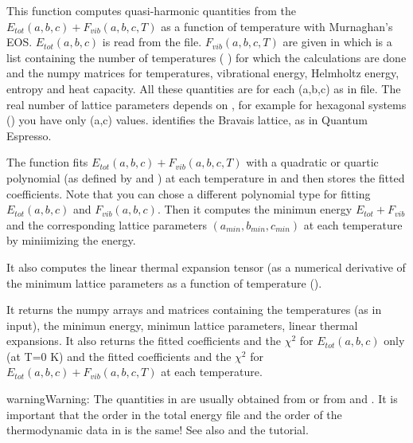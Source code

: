 \documentclass[letterpaper,10pt,english]{sphinxmanual}
\begin{document}
\label{pyqha:module-pyqha.fitFvib}

\begin{fulllineitems}
\label{pyqha:pyqha.fitFvib.fitFvib}
This function computes quasi-harmonic quantities from the 
\(E_{tot}(a,b,c)+F_{vib}(a,b,c,T)\) as a function of temperature with Murnaghan's
EOS. \(E_{tot}(a,b,c)\) is read from the  file. \(F_{vib}(a,b,c,T)\)
are given in  which is a list containing the number of temperatures
(  ) for which the calculations are done and the numpy matrices for 
temperatures, vibrational energy, Helmholtz energy, entropy and
heat capacity. All these quantities are for each (a,b,c) as in  file. The 
real number of lattice parameters depends on , for example for 
hexagonal systems () you have only (a,c) values.  identifies
the Bravais lattice, as in Quantum Espresso.

The function fits \(E_{tot}(a,b,c)+F_{vib}(a,b,c,T)\) with a quadratic
or quartic polynomial (as defined by  and  ) at each
temperature in  and then stores the fitted coefficients.    
Note that you can chose a different polynomial type for fitting \(E_{tot}(a,b,c)\)
and \(F_{vib}(a,b,c)\). Then it computes the minimun energy \(E_{tot}+F_{vib}\)
and the corresponding lattice parameters \((a_{min},b_{min},c_{min})\) 
at each temperature by miniimizing the energy.

It also computes the linear thermal expansion tensor (as a numerical derivative of
the minimum lattice parameters as a function of temperature ().

It returns the numpy arrays and matrices containing the temperatures (as in input), the
minimun energy, minimun lattice parameters, linear thermal expansions. It also
returns the fitted coefficients and the \(\chi^2\) for \(E_{tot}(a,b,c)\) 
only (at T=0 K) and the fitted coefficients and the \(\chi^2\) for 
\(E_{tot}(a,b,c)+F_{vib}(a,b,c,T)\) at each temperature.

\begin{sphinxadmonition}{warning}{Warning:}
The quantities in  are usually obtained from 
or from  and . It is
important that the order in the total energy file  and the order of
the thermodynamic data in  is the same!  See also  and 
the tutorial.
\end{sphinxadmonition}

\end{fulllineitems}
\end{document}

